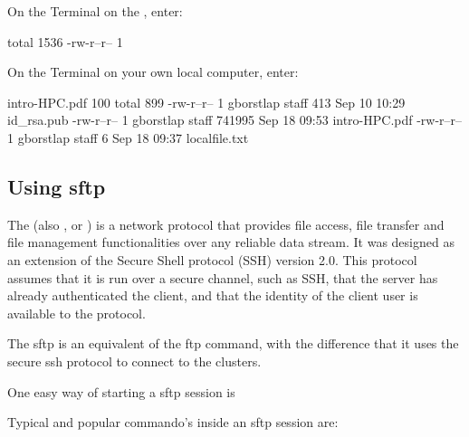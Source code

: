   On the Terminal on the \hpc, enter:

  \begin{prompt}
  total 1536
  -rw-r--r-- 1 %
  \end{prompt}

  On the Terminal on your own local computer, enter:

  \begin{prompt}
  intro-HPC.pdf 100%
  total  899
  -rw-r--r--   1 gborstlap  staff     413 Sep 10 10:29 id_rsa.pub
  -rw-r--r--   1 gborstlap  staff  741995 Sep 18 09:53 intro-HPC.pdf
  -rw-r--r--   1 gborstlap  staff       6 Sep 18 09:37 localfile.txt
  \end{prompt}

  \subsection{Using sftp}

  The  (also , or ) is a network protocol that provides file access,
  file transfer and file management functionalities over any reliable data
  stream. It was designed as an extension of the Secure Shell protocol (SSH)
  version 2.0. This protocol assumes that it is run over a secure channel, such
  as SSH, that the server has already authenticated the client, and that the
  identity of the client user is available to the protocol.

  The sftp is an equivalent of the ftp command, with the difference that it uses
  the secure ssh protocol to connect to the clusters.

  One easy way of starting a sftp session is
  \begin{prompt}
  \end{prompt}

  Typical and popular commando's inside an sftp session are:

